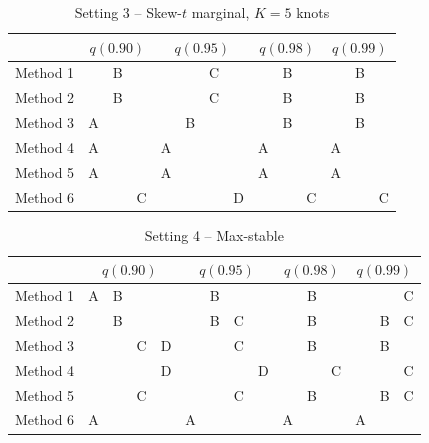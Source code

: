 \documentclass[11pt]{article}
\begin{document}
\begin{table}[htbp]
  \centering
  \caption{Setting 3 -- Skew-$t$ marginal, $K = 5$ knots}
  \label{tbl:st5sim}
  \begin{tabular}{|l|ccc|cccc|ccc|ccc|}
    \cline{2-14}
    \multicolumn{1}{c}{} & \multicolumn{3}{|c}{$q(0.90)$} & \multicolumn{4}{|c}{$q(0.95)$} & \multicolumn{3}{|c}{$q(0.98)$} & \multicolumn{3}{|c|}{$q(0.99)$} \\
    \hline
    Method 1 &   & B &   &   &   & C &   &   & B &   &   & B &   \\
    \hline
    Method 2 &   & B &   &   &   & C &   &   & B &   &   & B &   \\
    \hline
    Method 3 & A &   &   &   & B &   &   &   & B &   &   & B &   \\
    \hline
    Method 4 & A &   &   & A &   &   &   & A &   &   & A &   &   \\
    \hline
    Method 5 & A &   &   & A &   &   &   & A &   &   & A &   &   \\
    \hline
    Method 6 &   &   & C &   &   &   & D &   &   & C &   &   & C \\
    \hline
  \end{tabular}
\end{table}

\begin{table}[htbp]
  \centering
  \caption{Setting 4 -- Max-stable}
  \label{tbl:mssim}
  \begin{tabular}{|l|cccc|cccc|ccc|ccc|}
    \cline{2-15}
    \multicolumn{1}{c}{} & \multicolumn{4}{|c}{$q(0.90)$} & \multicolumn{4}{|c}{$q(0.95)$} & \multicolumn{3}{|c}{$q(0.98)$} & \multicolumn{3}{|c|}{$q(0.99)$} \\
    \hline
    Method 1 & A & B &   &   &   & B &   &   &   & B &   &   &   & C \\
    \hline
    Method 2 &   & B &   &   &   & B & C &   &   & B &   &   & B & C \\
    \hline
    Method 3 &   &   & C & D &   &   & C &   &   & B &   &   & B &   \\
    \hline
    Method 4 &   &   &   & D &   &   &   & D &   &   & C &   &   & C \\
    \hline
    Method 5 &   &   & C &   &   &   & C &   &   & B &   &   & B & C \\
    \hline
    Method 6 & A &   &   &   & A &   &   &   & A &   &   & A &   &   \\
    \hline
  \end{tabular}
\end{table}
\end{document}
